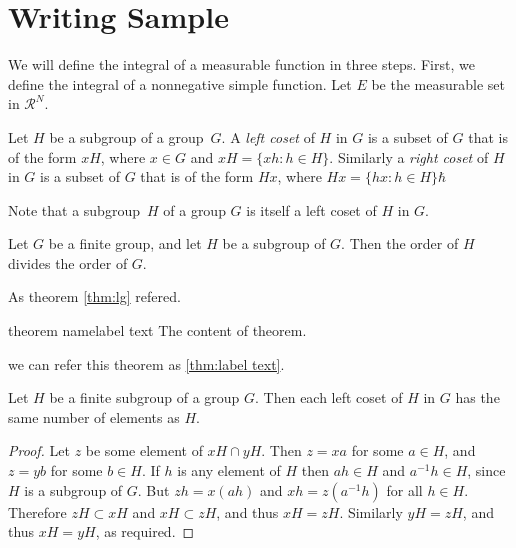 \documentclass[11pt]{elegantbook}
\begin{document}
\section{Writing Sample}

We will define the integral of a measurable function in three steps. First, we define the integral of a nonnegative simple function. Let $E$ be the measurable set in $\mathcal{R}^N$.

\begin{definition}
Let $H$ be a subgroup of a group~$G$.  A \emph{left coset} of $H$ in $G$ is a subset of $G$ that is of the form $xH$, where $x \in G$ and $xH = \{ xh : h \in H \}$. Similarly a \emph{right coset} of $H$ in $G$ is a subset of $G$ that is of the form $Hx$, where $Hx = \{ hx : h \in H \} \hbar$ 
\end{definition}

\begin{note}
Note that a subgroup~$H$ of a group $G$ is itself a left coset of $H$ in $G$.
\end{note}

\lipsum[2]

\begin{theorem} \label{thm:lg}
Let $G$ be a finite group, and let $H$ be a subgroup of $G$. Then the order of $H$ divides the order of $G$.
\end{theorem}

As theorem \ref{thm:lg} refered.

\lipsum[3]


\begin{theorem}{theorem name}{label text}
  The content of theorem.
\end{theorem}

we can refer this theorem as \ref{thm:label text}.


\begin{proposition}
Let $H$ be a finite subgroup of a group $G$.  Then each left coset of $H$ in $G$ has the same number of elements as $H$.
\end{proposition}

\begin{proof}
  Let $z$ be some element of $xH \cap yH$. Then $z = xa$ for some $a \in H$, and $z = yb$ for some $b \in H$. If $h$ is any element of $H$ then $ah \in H$ and $a^{-1}h \in H$, since $H$ is a subgroup of $G$. But $zh = x(ah)$ and $xh = z(a^{-1}h)$ for all $h \in H$. Therefore $zH \subset xH$ and $xH \subset zH$, and thus $xH = zH$.  Similarly $yH = zH$, and thus $xH = yH$, as required. 
\end{proof}
\end{document}
